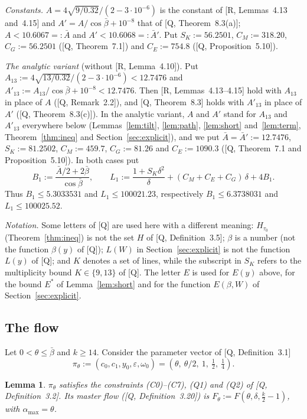 \documentclass[11pt]{amsart}
\newcommand{\amax}{\alpha_{\max}}
\newcommand{\bbar}{\bar\beta}
\newcommand{\Abar}{\bar A}
\newtheorem{lemma}[theorem]{Lemma}
\theoremstyle{definition}
\theoremstyle{remark}
\numberwithin{equation}{section}
\begin{document}
\emph{Constants.} $A=4\sqrt{9/0.32}/(2-3\cdot10^{-6})$ is the constant of [R, Lemmas~4.13 and~4.15] and
$A'=A/\cos\bbar+10^{-8}$ that of [Q, Theorem~8.3(a)]; $A<10.6067=:\Abar$ and $A'<10.6068=:\bar A'$. Put
$S_K:=56.2501$, $C_M:=318.20$, $C_G:=56.2501$ ([Q, Theorem~7.1]) and $C_E:=754.8$ ([Q, Proposition~5.10]).

\emph{The analytic variant} (without [R, Lemma~4.10]). Put $A_{13}:=4\sqrt{13/0.32}/(2-3\cdot10^{-6})<12.7476$ and
$A'_{13}:=A_{13}/\cos\bbar+10^{-8}<12.7476$. Then [R, Lemmas~4.13--4.15] hold with $A_{13}$ in place of $A$
([Q, Remark~2.2]), and [Q, Theorem~8.3] holds with $A'_{13}$ in place of $A'$ ([Q, Theorem~8.3(c)]). In the analytic
variant, $A$ and $A'$ stand for $A_{13}$ and $A'_{13}$ everywhere below (Lemmas~\ref{lem:tilt}, \ref{lem:path},
\ref{lem:short} and~\ref{lem:term}, Theorem~\ref{thm:ineq} and Section~\ref{sec:explicit}), and we put
$\Abar=\bar A':=12.7476$, $S_K:=81.2502$, $C_M:=459.7$, $C_G:=81.26$ and $C_E:=1090.3$ ([Q, Theorem~7.1 and
Proposition~5.10]). In both cases put
\[
B_1:=\frac{\Abar/2+2\bbar}{\cos\bbar},\qquad L_1:=\frac{1+S_K\delta^2}{\delta}+(C_M+C_E+C_G)\,\delta+4B_1 .
\]
Thus $B_1\le5.3033531$ and $L_1\le100021.23$, respectively $B_1\le6.3738031$ and $L_1\le100025.52$.

\emph{Notation.} Some letters of [Q] are used here with a different meaning: $H_{\tau_0}$ (Theorem~\ref{thm:ineq}) is
not the set $H$ of [Q, Definition~3.5]; $\beta$ is a number (not the function $\beta(y)$ of [Q]); $L(W)$ in
Section~\ref{sec:explicit} is not the function $L(y)$ of [Q]; and $K$ denotes a set of lines, while the subscript in
$S_K$ refers to the multiplicity bound $K\in\{9,13\}$ of [Q]. The letter $E$ is used for $E(y)$ above, for the bound
$E^*$ of Lemma~\ref{lem:short} and for the function $E(\beta,W)$ of Section~\ref{sec:explicit}.

\subsection{The flow}
Let $0<\theta\le\bbar$ and $k\ge14$. Consider the parameter vector of [Q, Definition~3.1]
\[
\pi_\theta:=(c_0,c_1,y_0,\varepsilon,\omega_0)=(\theta,\ \theta/2,\ 1,\ \tfrac12,\ \tfrac14).
\]

\begin{lemma}\label{lem:inst}
$\pi_\theta$ satisfies the constraints \textup{(C0)--(C7)}, \textup{(Q1)} and \textup{(Q2)} of [Q, Definition~3.2].
Its master flow \textup{([Q, Definition~3.20])} is $F_\theta:=F(\theta,\delta,\frac k2-1)$, with $\amax=\theta$.
\end{lemma}
\end{document}

